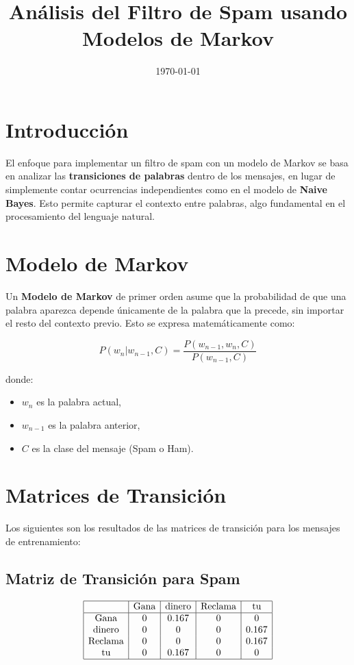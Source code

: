 \documentclass{article}
\title{Análisis del Filtro de Spam usando Modelos de Markov}
\author{}
\date{\today}
\begin{document}
\maketitle

\section{Introducción}
El enfoque para implementar un filtro de spam con un modelo de Markov se basa en analizar las \textbf{transiciones de palabras} dentro de los mensajes, en lugar de simplemente contar ocurrencias independientes como en el modelo de \textbf{Naive Bayes}. Esto permite capturar el contexto entre palabras, algo fundamental en el procesamiento del lenguaje natural.

\section{Modelo de Markov}
Un \textbf{Modelo de Markov} de primer orden asume que la probabilidad de que una palabra aparezca depende únicamente de la palabra que la precede, sin importar el resto del contexto previo. Esto se expresa matemáticamente como:

\begin{equation}
P(w_n | w_{n-1}, C) = \frac{P(w_{n-1}, w_n, C)}{P(w_{n-1}, C)}
\end{equation}

donde:
\begin{itemize}
    \item $w_n$ es la palabra actual,
    \item $w_{n-1}$ es la palabra anterior,
    \item $C$ es la clase del mensaje (Spam o Ham).
\end{itemize}

\section{Matrices de Transición}
Los siguientes son los resultados de las matrices de transición para los mensajes de entrenamiento:

\subsection{Matriz de Transición para Spam}
\begin{equation}
\begin{array}{|c|c|c|c|c|}
\hline
 & \text{Gana} & \text{dinero} & \text{Reclama} & \text{tu} \\
\hline
\text{Gana} & 0 & 0.167 & 0 & 0 \\
\text{dinero} & 0 & 0 & 0 & 0.167 \\
\text{Reclama} & 0 & 0 & 0 & 0.167 \\
\text{tu} & 0 & 0.167 & 0 & 0 \\
\hline
\end{array}
\end{equation}
\end{document}
